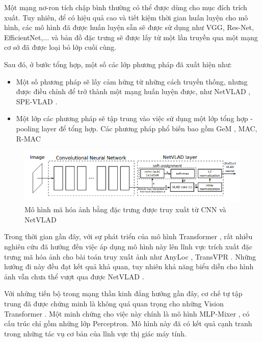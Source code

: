 Một mạng nơ-ron tích chập bình thường có thể được dùng cho mục đích trích xuất. Tuy nhiên, để có hiệu quả cao và tiết kiệm thời gian huấn luyện cho mô hình, các mô hình đã được huấn luyện sẵn sẽ được sử dụng như VGG, Res-Net, EfficientNet,... và bản đồ đặc trưng sẽ được lấy từ một lần truyền qua một mạng cơ sở đã được loại bỏ lớp cuối cùng.

Sau đó, ở bước tổng hợp, một số các lớp phương pháp đã xuất hiện như:
\begin{itemize}
    \item Một số phương pháp sẽ lấy cảm hứng từ những cách truyền thống, nhưng được điều chỉnh để trở thành một mạng huấn luyện được, như NetVLAD \cite{arandjelović2016netvlad}, SPE-VLAD \cite{yu2019spatial}. 
    \item Một lớp các phương pháp sẽ tập trung vào việc sử dụng một lớp tổng hợp - pooling layer để tổng hợp. Các phương pháp phổ biến bao gồm GeM \cite{radenovic2018fine}, MAC, R-MAC \cite{tolias2015particular}
\end{itemize}

\begin{figure}[H]
    \centering
    \includegraphics[scale=0.8]{pics/Chapter3/netvlad.png}
    \caption{Mô hình mã hóa ảnh bằng đặc trưng được truy xuất từ CNN và  NetVLAD \cite{arandjelović2016netvlad}}
    \label{fig:enter-label}
\end{figure}

Trong thời gian gần đây, với sự phát triển của mô hình Transformer \cite{vaswani2023attention}, rất nhiều nghiên cứu đã hướng đến việc áp dụng mô hình này lên lĩnh vực trích xuất đặc trưng mã hóa ảnh cho bài toán truy xuất ảnh như AnyLoc \cite{keetha2023anyloc}, TransVPR \cite{wang2022transvpr}. Những hướng đi này đều đạt kết quả khả quan, tuy nhiên khả năng biểu diễn cho hình ảnh vẫn chưa thể vượt qua được NetVLAD \cite{alibey2023mixvpr}.

Với những tiến bộ trong mạng thần kinh đẳng hướng gần đây, cơ chế tự tập trung đã được chứng minh là không quá quan trọng cho những Vision Transformer \cite{dosovitskiy2021image}. Một minh chứng cho việc này chính là mô hình MLP-Mixer \cite{tolstikhin2021mlpmixer}, có cấu trúc chỉ gồm những lớp Perceptron. Mô hình này đã có kết quả cạnh tranh trong những tác vụ cơ bản của lĩnh vực thị giác máy tính.

